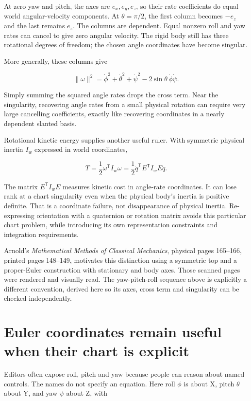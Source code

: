 At zero yaw and pitch, the axes are \(e_x,e_y,e_z\), so their rate coefficients do equal world angular-velocity components. At \(\theta=\pi/2\), the first column becomes \(-e_z\) and the last remains \(e_z\). The columns are dependent. Equal nonzero roll and yaw rates can cancel to give zero angular velocity. The rigid body still has three rotational degrees of freedom; the chosen angle coordinates have become singular.

More generally, these columns give

\[
\|\omega\|^2=
\dot\phi^2+\dot\theta^2+\dot\psi^2
-2\sin\theta\,\dot\phi\dot\psi.
\]

Simply summing the squared angle rates drops the cross term. Near the singularity, recovering angle rates from a small physical rotation can require very large cancelling coefficients, exactly like recovering coordinates in a nearly dependent slanted basis.

Rotational kinetic energy supplies another useful ruler. With symmetric physical inertia \(I_w\) expressed in world coordinates,

\[
T=\frac12\omega^{\mathsf T}I_w\omega
=\frac12\dot q^{\mathsf T}E^{\mathsf T}I_wE\dot q.
\]

The matrix \(E^{\mathsf T}I_wE\) measures kinetic cost in angle-rate coordinates. It can lose rank at a chart singularity even when the physical body's inertia is positive definite. That is a coordinate failure, not disappearance of physical inertia. Re-expressing orientation with a quaternion or rotation matrix avoids this particular chart problem, while introducing its own representation constraints and integration requirements.

Arnold's \emph{Mathematical Methods of Classical Mechanics}, physical pages 165--166, printed pages 148--149, motivates this distinction using a symmetric top and a proper-Euler construction with stationary and body axes. Those scanned pages were rendered and visually read. The yaw-pitch-roll sequence above is explicitly a different convention, derived here so its axes, cross term and singularity can be checked independently.

\section{Euler coordinates remain useful when their chart is explicit}\label{01-foundations-i-ch019-euler-coordinates-remain-useful-when-their-chart-is-explicit}

Editors often expose roll, pitch and yaw because people can reason about named controls. The names do not specify an equation. Here roll \(\phi\) is about X, pitch \(\theta\) about Y, and yaw \(\psi\) about Z, with

